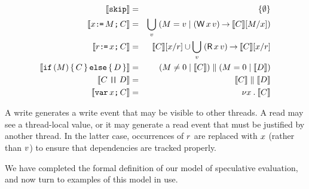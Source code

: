 \begin{definition}
  \label{def:programs}
\begin{eqnarray*}
  \sem{\SKIP} & = & \{ \emptyset \} \\
  \sem{\aLoc\GETS\aExp\SEMI \aCmd} & = & \bigcup_\aVal\; (\aExp=\aVal \mid (\DW\aLoc\aVal) \prefix \sem{\aCmd}[\aExp/\aLoc]) \\
  \sem{\aReg\GETS\aLoc\SEMI \aCmd} & = & \sem{\aCmd}[\aLoc/\aReg] \cup \bigcup_\aVal\; (\DR\aLoc\aVal) \prefix \sem{\aCmd}[\aLoc/\aReg] \\
  \sem{\IF (\aExp) \THEN \aCmd \ELSE \bCmd \FI} & = & (\aExp \neq 0 \mid \sem{\aCmd}) \parallel (\aExp=0 \mid \sem{\bCmd}) \\
  \sem{\aCmd \PAR \bCmd} & = & \sem{\aCmd} \parallel \sem{\bCmd} \\
  \sem{\VAR\aLoc\SEMI \aCmd} & = & \nu \aLoc \st \sem{\aCmd}
\end{eqnarray*}
\end{definition}

A write generates a write event that may be visible
to other threads.  A read may see a
thread-local value, or it may generate a read event that must be justified by
another thread.  In the latter case, occurrences of $r$ are replaced with
$x$ (rather than $v$) to ensure that dependencies are tracked
properly.

We have completed the formal definition of our model of speculative
evaluation, and now turn to examples of this model in use.
